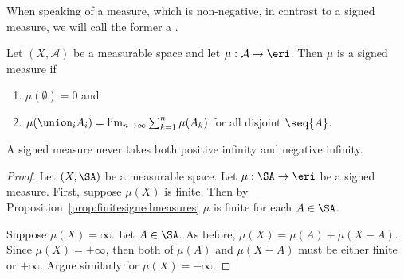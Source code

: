 When speaking of a measure,
which is non-negative,
in contrast to a signed measure,
we will call the former a
.


Let
$(X, \mathcal{A})$
be a measurable space
and let
$\mu: \mathcal{A} \to \eri$.
Then $\mu$ is a signed measure if
\begin{enumerate}
  \item $\mu(\emptyset) = 0$ and
  \item
  $\mu(\union_{i} A_i) =
    \lim_{n \to \infty}
      \sum_{k = 1}^{n} \mu(A_k)$
  for all disjoint $\seq{A}$.
\end{enumerate}

\begin{prop}
A signed measure never takes
both positive infinity and
negative infinity.
\begin{proof}
Let $(X,\SA)$ be a measurable space.
Let $\mu: \SA \to \eri$ be a signed measure.
First, suppose $\mu(X)$ is finite,
Then by
Proposition~\ref{prop:finitesignedmeasures}
$\mu$ is finite for each $A \in \SA$.

Suppose $\mu(X) = \infty$.
Let $A \in \SA$.
As before,
$\mu(X) = \mu(A) + \mu(X - A)$.
Since $\mu(X) = +\infty$, then
both of $\mu(A)$ and $\mu(X-A)$
must be either finite or $+\infty$.
Argue similarly for $\mu(X) = -\infty$.
\end{proof}
\end{prop}
\strats
